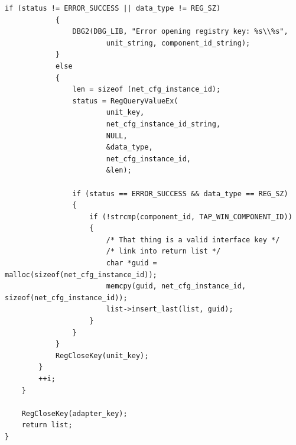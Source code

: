 \begin{lstlisting}[caption=Code für das Suchen eines TAP-Geräts]
            if (status != ERROR_SUCCESS || data_type != REG_SZ)
            {
                DBG2(DBG_LIB, "Error opening registry key: %s\\%s",
                        unit_string, component_id_string);
            }
            else
            {
                len = sizeof (net_cfg_instance_id);
                status = RegQueryValueEx(
                        unit_key,
                        net_cfg_instance_id_string,
                        NULL,
                        &data_type,
                        net_cfg_instance_id,
                        &len);

                if (status == ERROR_SUCCESS && data_type == REG_SZ)
                {
                    if (!strcmp(component_id, TAP_WIN_COMPONENT_ID))
                    {
                        /* That thing is a valid interface key */
                        /* link into return list */
                        char *guid = malloc(sizeof(net_cfg_instance_id));
                        memcpy(guid, net_cfg_instance_id, sizeof(net_cfg_instance_id));
                        list->insert_last(list, guid);
                    }
                }
            }
            RegCloseKey(unit_key);
        }
        ++i;
    }

    RegCloseKey(adapter_key);
    return list;
}
\end{lstlisting}

